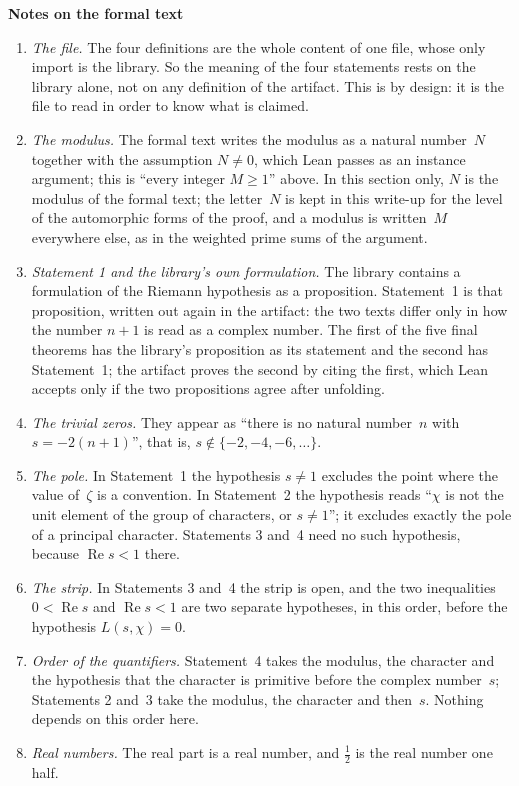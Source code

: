\documentclass[11pt,a4paper]{article}
\newcommand{\m}[1]{\mbox{$#1$}}        %
\newcommand{\sect}[2]{\refstepcounter{section}\label{#2}\par\addvspace{19pt plus 4pt minus 2pt}\Needspace{7\baselineskip}%
  \noindent\llap{{\fontsize{13.2}{16}\selectfont\bfseries\color{inkfaint}\thesection}\hspace{9pt}}%
  {\fontsize{13.2}{16}\selectfont\bfseries\color{ink}#1}\par\nopagebreak\vspace{-1pt}}
\theoremstyle{plainx}
\theoremstyle{uprightx}
\newcommand{\re}{\operatorname{Re}}
\begin{document}
\sect{Notes on the formal text}{s:notes}
\begin{enumerate}[label=\textup{\arabic*.},leftmargin=1.6em,itemsep=5pt]
\item \emph{The file.} The four definitions are the whole content of one file, whose only import is the library.
So the meaning of the four statements rests on the library alone, not on any definition of the artifact. This is
by design: it is the file to read in order to know what is claimed.
\item \emph{The modulus.} The formal text writes the modulus as a natural number~$N$ together with the
assumption \m{N\ne0}, which Lean passes as an instance argument; this is ``every integer \m{M\ge1}'' above. In this
section only, $N$ is the modulus of the formal text; the letter~$N$ is kept in this write-up for the level of the automorphic forms of the proof, and a modulus is
written~$M$ everywhere else, as in the weighted prime sums of the argument.
\item \emph{Statement 1 and the library's own formulation.} The library contains a formulation of the Riemann
hypothesis as a proposition. Statement~1 is that proposition, written out again in the artifact: the two texts
differ only in how the number \m{n+1} is read as a complex number. The first of the five final theorems has the
library's proposition as its statement and the second has Statement~1; the artifact proves the second by citing
the first, which Lean accepts only if the two propositions agree after unfolding.
\item \emph{The trivial zeros.} They appear as ``there is no natural number~$n$ with \m{s=-2(n+1)}'', that is,
\m{s\notin\{-2,-4,-6,\dots\}}.
\item \emph{The pole.} In Statement~1 the hypothesis \m{s\ne1} excludes the point where the value of~$\zeta$ is a
convention. In Statement~2 the hypothesis reads ``$\chi$ is not the unit element of the group of characters, or
\m{s\ne1}''; it excludes exactly the pole of a principal character. Statements 3 and~4 need no such hypothesis,
because \m{\re s<1} there.
\item \emph{The strip.} In Statements 3 and~4 the strip is open, and the two inequalities \m{0<\re s} and
\m{\re s<1} are two separate hypotheses, in this order, before the hypothesis \m{L(s,\chi)=0}.
\item \emph{Order of the quantifiers.} Statement~4 takes the modulus, the character and the hypothesis that the
character is primitive before the complex number~$s$; Statements 2 and~3 take the modulus, the character and
then~$s$. Nothing depends on this order here.
\item \emph{Real numbers.} The real part is a real number, and \m{\tfrac12} is the real number one half.
\end{enumerate}
\end{document}
